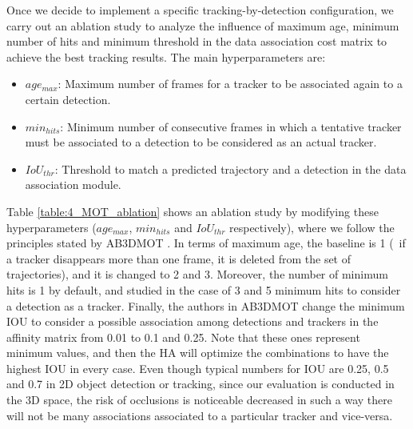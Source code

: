 Once we decide to implement a specific tracking-by-detection configuration, we carry out an ablation study to analyze the influence of maximum age, minimum number of hits and minimum threshold in the data association cost matrix to achieve the best tracking results. The main hyperparameters are:

\begin{itemize}
	
	\item \textbf{$age_{max}$}: Maximum number of frames for a tracker to be associated again to a certain detection.
	
	\item \textbf{$min_{hits}$}: Minimum number of consecutive frames in which a tentative tracker must be associated to a detection to be considered as an actual tracker.
	
	\item \textbf{$IoU_{thr}$}: Threshold to match a predicted trajectory and a detection in the data association module.
	
\end{itemize}

Table \ref{table:4_MOT_ablation} shows an ablation study by modifying these hyperparameters ($age_{max}$, $min_{hits}$ and $IoU_{thr}$ respectively), where we follow the principles stated by AB3DMOT \cite{weng2019baseline}. In terms of maximum age, the baseline is 1 (\ie \ if a tracker disappears more than one frame, it is deleted from the set of trajectories), and it is changed to 2 and 3. Moreover, the number of minimum hits is 1 by default, and studied in the case of 3 and 5 minimum hits to consider a detection as a tracker. Finally, the authors in AB3DMOT \cite{weng20203d} \cite{weng2019baseline} change the minimum \ac{IOU} to consider a possible association among detections and trackers in the affinity matrix from 0.01 to 0.1 and 0.25. Note that these ones represent minimum values, and then the \ac{HA} will optimize the combinations to have the highest \ac{IOU} in every case. Even though typical numbers for \ac{IOU} are 0.25, 0.5 and 0.7 in 2D object detection or tracking, since our evaluation is conducted in the 3D space, the risk of occlusions is noticeable decreased in such a way there will not be many associations associated to a particular tracker and vice-versa.

